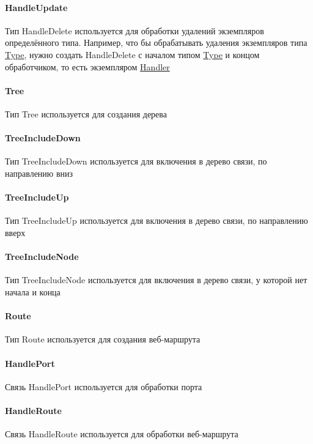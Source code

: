 \paragraph*{HandleUpdate}\hypertarget{Core.HandleDelete.Description}{}
Тип HandleDelete используется для обработки
удалений экземпляров определённого типа. Например, что бы обрабатывать удаления
экземпляров типа \hyperlink{Core.Type.Description}{Type}, нужно создать
HandleDelete с
началом типом \hyperlink{Core.Type.Description}{Type} и концом обработчиком, то
есть
экземпляром \hyperlink{Core.Handler.Description}{Handler}
\paragraph*{Tree}\hypertarget{Core.Tree.Description}{}
Тип Tree используется для создания дерева
\paragraph*{TreeIncludeDown}\hypertarget{Core.TreeIncludeDown.Description}{}
Тип TreeIncludeDown используется для
включения в дерево связи, по направлению вниз
\paragraph*{TreeIncludeUp}\hypertarget{Core.TreeIncludeUp.Description}{}
Тип TreeIncludeUp используется для включения в
дерево связи, по направлению вверх 
\paragraph*{TreeIncludeNode}\hypertarget{Core.TreeIncludeNode.Description}{}
Тип TreeIncludeNode используется для
включения в дерево связи, у которой нет начала и конца
\paragraph*{Route}\hypertarget{Core.Route.Description}{}
Тип Route используется для создания веб-маршрута
\paragraph*{HandlePort}\hypertarget{Core.HandlePort.Description}{}
Связь HandlePort используется для обработки порта
\paragraph*{HandleRoute}\hypertarget{Core.HandleRoute.Description}{}
Связь HandleRoute используется для обработки
веб-маршрута
